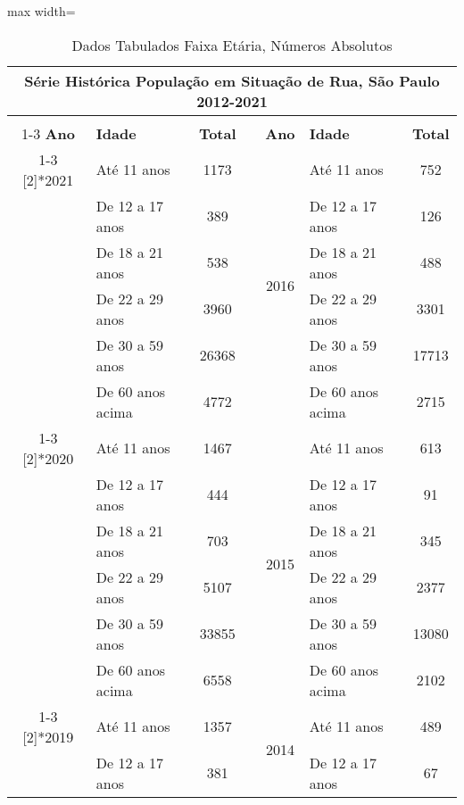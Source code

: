 \documentclass[14pt]{extarticle}
\begin{document}
\begin{table}[htbp]
  \centering
  \caption{Dados Tabulados Faixa Etária, Números Absolutos}
   \tabcolsep=0.15cm
	\renewcommand{\arraystretch}{1.0}
	\begin{adjustbox}{max width=\linewidth}
    \begin{tabular}{clcrclc}
    \toprule
    \multicolumn{7}{c}{Série Histórica População em Situação de Rua, São Paulo 2012-2021} \\
    \midrule
         &      &      &      &      &      &  \\
\cmidrule{1-3}\cmidrule{5-7}    \rowcolor[rgb]{ .906,  .902,  .902} \textbf{Ano} & \textbf{Idade} & \textbf{Total} & \cellcolor[rgb]{ 1,  1,  1} & \textbf{Ano} & \textbf{Idade} & \textbf{Total} \\
\cmidrule{1-3}\cmidrule{5-7}    \multirow{6}[2]{*}{2021} & Até 11 anos & 1173  &      & \multirow{6}[2]{*}{2016} & Até 11 anos & 752 \\
         & De 12 a 17 anos & 389  &      &      & De 12 a 17 anos & 126 \\
         & De 18 a 21 anos & 538  &      &      & De 18 a 21 anos & 488 \\
         & De 22 a 29 anos & 3960 &      &      & De 22 a 29 anos & 3301 \\
         & De 30 a 59 anos & 26368 &      &      & De 30 a 59 anos & 17713 \\
         & De 60 anos acima & 4772 &      &      & De 60 anos acima & 2715 \\
\cmidrule{1-3}\cmidrule{5-7}    \multirow{6}[2]{*}{2020} & Até 11 anos & 1467 &      & \multirow{6}[2]{*}{2015} & Até 11 anos & 613 \\
         & De 12 a 17 anos & 444  &      &      & De 12 a 17 anos & 91 \\
         & De 18 a 21 anos & 703  &      &      & De 18 a 21 anos & 345 \\
         & De 22 a 29 anos & 5107 &      &      & De 22 a 29 anos & 2377 \\
         & De 30 a 59 anos & 33855 &      &      & De 30 a 59 anos & 13080 \\
         & De 60 anos acima & 6558 &      &      & De 60 anos acima & 2102 \\
\cmidrule{1-3}\cmidrule{5-7}    \multirow{6}[2]{*}{2019} & Até 11 anos & 1357 &      & \multirow{6}[2]{*}{2014} & Até 11 anos & 489 \\
         & De 12 a 17 anos & 381  &      &      & De 12 a 17 anos & 67 \\

\end{tabular}
\end{adjustbox}
\end{table}
\end{document}

